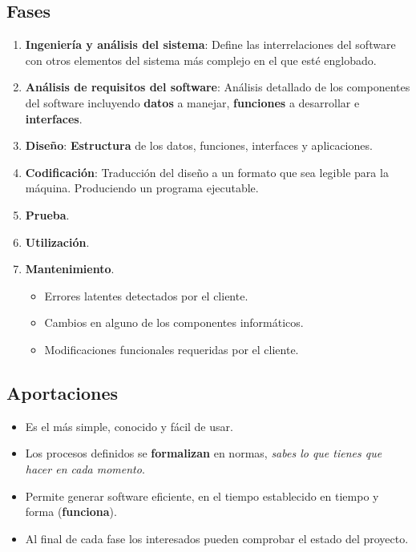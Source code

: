 \subsection{Fases}
\begin{enumerate}

   \item \textbf{Ingeniería y análisis del sistema}: Define las interrelaciones del software con otros elementos del sistema más complejo en el que esté englobado.

   \item \textbf{Análisis de requisitos del software}: Análisis detallado de los componentes del software incluyendo \textbf{datos} a manejar, \textbf{funciones} a desarrollar e \textbf{interfaces}.

   \item \textbf{Diseño}: \textbf{Estructura} de los datos, funciones, interfaces y aplicaciones.

   \item \textbf{Codificación}: Traducción del diseño a un formato que sea legible para la máquina. Produciendo un programa ejecutable.


   \item \textbf{Prueba}.

   \item \textbf{Utilización}.
   \item \textbf{Mantenimiento}.

         \begin{itemize}
            \item Errores latentes detectados por el cliente.
            \item Cambios en alguno de los componentes informáticos.
            \item Modificaciones funcionales requeridas por el cliente.
         \end{itemize}
\end{enumerate}

\subsection{Aportaciones}
\begin{itemize}
   \item Es el más simple, conocido y fácil de usar.
   \item Los procesos definidos se \textbf{formalizan} en normas, \textit{sabes lo que tienes que hacer en cada momento}.
   \item Permite generar software eficiente, en el tiempo establecido en tiempo y forma (\textbf{funciona}).
   \item Al final de cada fase los interesados pueden comprobar el estado del proyecto.
\end{itemize}

